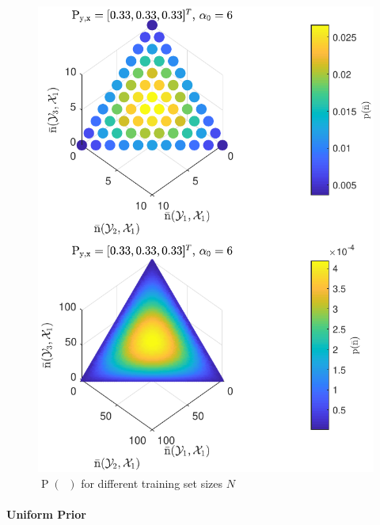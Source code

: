 \documentclass[12pt]{report}
\DeclareMathOperator{\nbarrm}{\bar{\mathrm{n}}}
\DeclareMathOperator{\Prm}{\mathrm{P}}
\begin{document}
\begin{figure}
\centering
\includegraphics[width=0.7\linewidth]{P_nbar_N.pdf}
\caption{$\Prm(\nbarrm)$ for different training set sizes $N$}
\label{fig:P_nbar_N}
\end{figure}




\paragraph{Uniform Prior}
\end{document}
